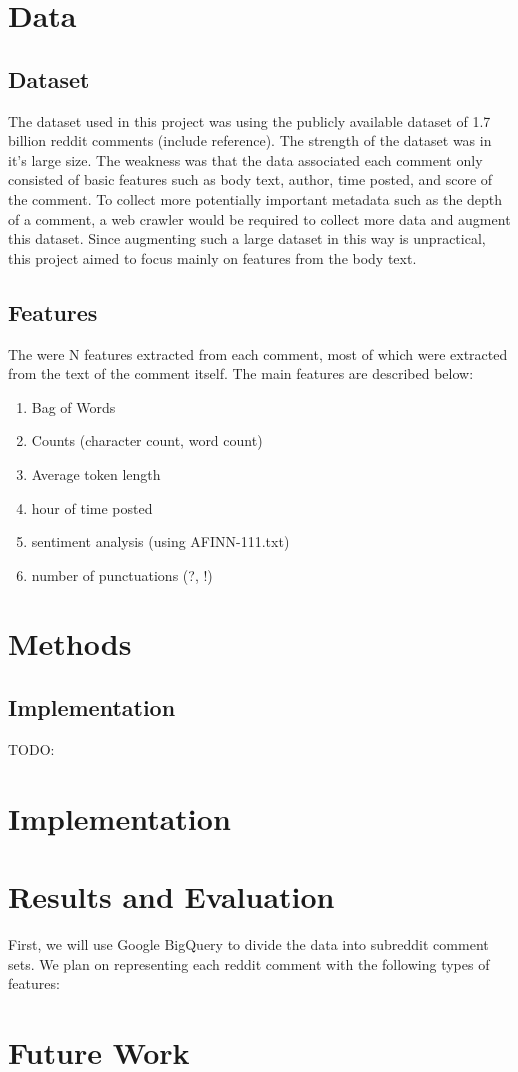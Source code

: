 \documentclass[11pt, twocolumn]{article}
\begin{document}
\section{Data}
	\subsection{Dataset}
	The dataset used in this project was using the publicly available dataset of 1.7 billion reddit comments (include reference). The strength of the dataset was in it's large size. The weakness was that the data associated each comment only consisted of basic features such as body text, author, time posted, and score of the comment. To collect more potentially important metadata such as the depth of a comment, a web crawler would be required to collect more data and augment this dataset. Since augmenting such a large dataset in this way is unpractical, this project aimed to focus mainly on features from the body text.
	
	\subsection{Features}
	The were N features extracted from each comment, most of which were extracted from the text of the comment itself. The main features are described below:
	\begin{enumerate}
		\item Bag of Words
		\item Counts (character count, word count)
		\item Average token length
		\item hour of time posted
		\item sentiment analysis (using AFINN-111.txt)
		\item number of punctuations (?, !)
	\end{enumerate}

\section{Methods}

	\subsection{Implementation}
	TODO:

\section{Implementation}

\section{Results and Evaluation}

First, we will use Google BigQuery to divide the data into subreddit comment sets. We plan on representing each reddit comment with the following types of features:

\section{Future Work}





\end{document}
